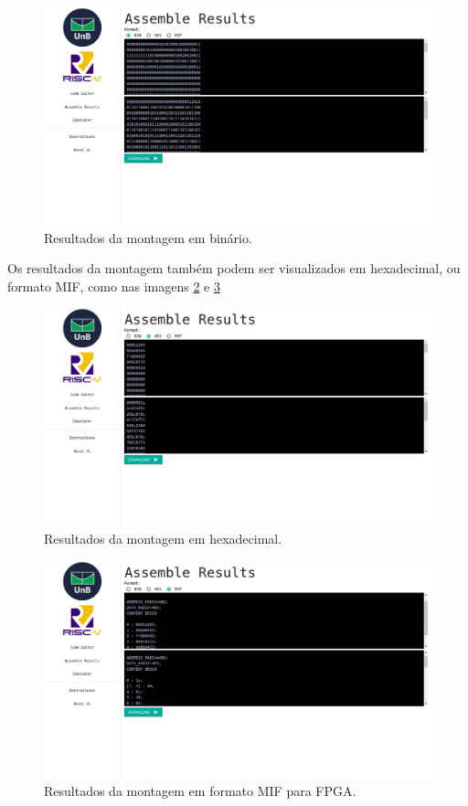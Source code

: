 	\begin{figure}[h]
	  \includegraphics[width=\linewidth]{img/assemble_data_bin.png}
	  \caption{Resultados da montagem em binário.}
	  \label{fig:assemble_data_bin}
	\end{figure}

	Os resultados da montagem também podem ser visualizados em hexadecimal, ou formato MIF, como nas imagens \ref{fig:assemble_data_hex} e \ref{fig:assemble_data_mif}

	\begin{figure}[h]
	  \includegraphics[width=\linewidth]{img/assemble_data_hex.png}
	  \caption{Resultados da montagem em hexadecimal.}
	  \label{fig:assemble_data_hex}
	\end{figure}

	\begin{figure}[h]
	  \includegraphics[width=\linewidth]{img/assemble_data_mif.png}
	  \caption{Resultados da montagem em formato MIF para FPGA.}
	  \label{fig:assemble_data_mif}
	\end{figure}



